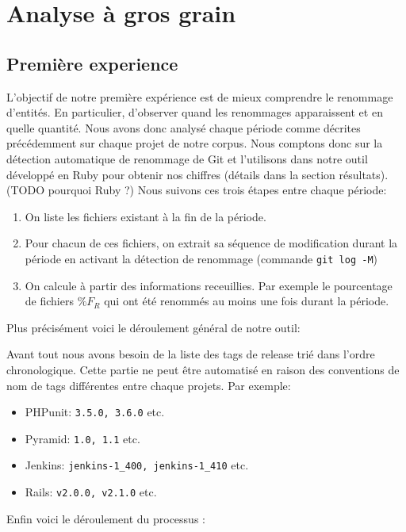 \section{Analyse à gros grain}
\label{sec:analyse_gros_grain}

\subsection{Première experience}
L'objectif de notre première expérience est de mieux comprendre le renommage d'entités. En particulier, d'observer quand les renommages apparaissent et en quelle quantité. Nous avons donc analysé chaque période comme décrites précédemment sur chaque projet de notre corpus. Nous comptons donc sur la détection automatique de renommage de Git et l'utilisons dans notre outil développé en Ruby pour obtenir nos chiffres (détails dans la section résultats). (TODO pourquoi Ruby ?) Nous suivons ces trois étapes entre chaque période:
\begin{enumerate}
\item On liste les fichiers existant à la fin de la période.
\item Pour chacun de ces fichiers, on extrait sa séquence de modification durant la période en activant la détection de renommage (commande \texttt{git log -M})
\item On calcule à partir des informations receuillies. Par exemple le pourcentage de fichiers $\%F_{R}$ qui ont été renommés au moins une fois durant la période.
\end{enumerate}
\medskip
Plus précisément voici le déroulement général de notre outil:

Avant tout nous avons besoin de la liste des tags de release trié dans l'ordre chronologique. Cette partie ne peut être automatisé en raison des conventions de nom de tags différentes entre chaque projets. Par exemple: 
\begin{itemize}
\item PHPunit: \texttt{3.5.0, 3.6.0} etc.
\item Pyramid: \texttt{1.0, 1.1} etc.
\item Jenkins: \texttt{jenkins-1\_400, jenkins-1\_410} etc.
\item Rails: \texttt{v2.0.0, v2.1.0} etc.
\end{itemize}
\medskip
Enfin voici le déroulement du processus :

